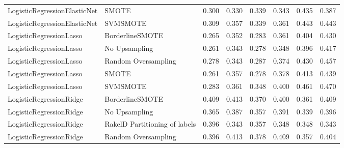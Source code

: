 \begin{tabular}{llllllll}
   LogisticRegressionElasticNet &                         SMOTE & 0.300 &                     0.330 &                 0.339 &                  0.343 &                                   0.435 &     0.387 \\
   LogisticRegressionElasticNet &                      SVMSMOTE & 0.309 &                     0.357 &                 0.339 &                  0.361 &                                   0.443 &     0.443 \\
        LogisticRegressionLasso &               BorderlineSMOTE & 0.265 &                     0.352 &                 0.283 &                  0.361 &                                   0.404 &     0.430 \\
        LogisticRegressionLasso &                 No Upsampling & 0.261 &                     0.343 &                 0.278 &                  0.348 &                                   0.396 &     0.417 \\
        LogisticRegressionLasso &           Random Oversampling & 0.278 &                     0.343 &                 0.287 &                  0.374 &                                   0.430 &     0.457 \\
        LogisticRegressionLasso &                         SMOTE & 0.261 &                     0.357 &                 0.278 &                  0.378 &                                   0.413 &     0.439 \\
        LogisticRegressionLasso &                      SVMSMOTE & 0.283 &                     0.361 &                 0.348 &                  0.400 &                                   0.461 &     0.470 \\
        LogisticRegressionRidge &               BorderlineSMOTE & 0.409 &                     0.413 &                 0.370 &                  0.400 &                                   0.361 &     0.409 \\
        LogisticRegressionRidge &                 No Upsampling & 0.365 &                     0.387 &                 0.357 &                  0.391 &                                   0.339 &     0.396 \\
        LogisticRegressionRidge & RakelD Partitioning of labels & 0.396 &                     0.343 &                 0.357 &                  0.348 &                                   0.348 &     0.343 \\
        LogisticRegressionRidge &           Random Oversampling & 0.396 &                     0.413 &                 0.378 &                  0.409 &                                   0.357 &     0.404 \\

\end{tabular}
